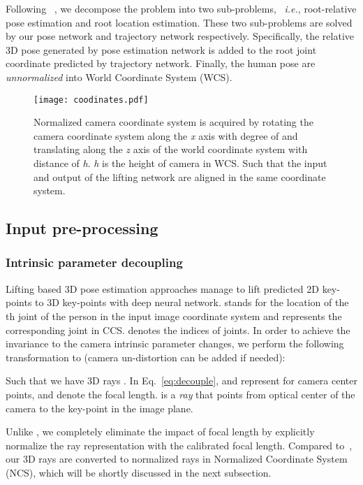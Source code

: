 \documentclass[10pt,twocolumn,letterpaper]{article}
\def\ie{\emph{i.e.}}
\begin{document}
Following ~\cite{dario2019videopose}, we decompose the problem into two sub-problems, ~\ie, root-relative pose estimation and root location estimation. These two sub-problems are solved by our pose network and trajectory network respectively. Specifically, the relative 3D pose generated by pose estimation network is added to the root joint coordinate predicted by trajectory network. Finally, the human pose are \emph{unnormalized} into World Coordinate System (WCS).

\begin{figure}[tbp]
    \centering
	\texttt{[image: coodinates.pdf]}
	\vskip-9pt
	\caption{Normalized camera coordinate system is acquired by rotating the camera coordinate system along the \emph{x} axis with degree of  and translating along the \emph{z} axis of the world coordinate system with distance of \emph{h}. \emph{h} is the height of camera in WCS. Such that the input and output of the lifting network are aligned in the same coordinate system.}
	\label{fig:normalized}
	\vspace{-4mm}
\end{figure}

\noindent\subsection{Input pre-processing}
\label{sec:preprocessing}

\subsubsection*{Intrinsic parameter decoupling}
\label{subsec: intrinsic}

Lifting based 3D pose estimation approaches manage to lift predicted 2D key-points  to 3D key-points  with deep neural network.  stands for the location of the  th joint of the person in the input image coordinate system and  represents the corresponding joint in CCS.  denotes the indices of joints. In order to achieve the invariance to the  camera intrinsic parameter changes, we perform the following transformation to  (camera un-distortion can be added if needed):

Such that we have 3D rays . In Eq.~\ref{eq:decouple},  and  represent for camera center points,  and  denote the focal length.  is a \emph{ray} that points from optical center of the camera to the key-point  in the image plane. 

Unlike \cite{ju2019absposelifter}, we completely eliminate the impact of focal length by explicitly normalize the ray representation with the calibrated focal length. Compared to~\cite{Cho_2021_ICCV}, our 3D rays are converted to normalized rays in Normalized Coordinate System (NCS), which will be shortly discussed in the next subsection.
\end{document}
